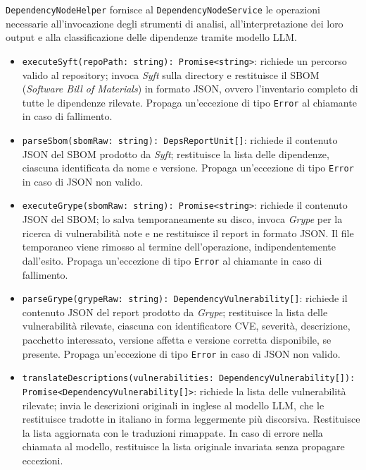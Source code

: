 \documentclass[a4paper, 11pt]{article}
\newcounter{subsubsubsection}[subsubsection]
\begin{document}
\texttt{DependencyNodeHelper} fornisce al \texttt{DependencyNodeService} le operazioni
necessarie all'invocazione degli strumenti di analisi, all'interpretazione dei loro
output e alla classificazione delle dipendenze tramite modello LLM.
\begin{itemize}
  \item \texttt{executeSyft(repoPath: string): Promise<string>}:
  richiede un percorso valido al repository; invoca \textit{Syft} sulla directory e
  restituisce il SBOM (\textit{Software Bill of Materials}) in formato JSON, ovvero
  l'inventario completo di tutte le dipendenze rilevate. Propaga un'eccezione di tipo
  \texttt{Error} al chiamante in caso di fallimento.
 
  \item \texttt{parseSbom(sbomRaw: string): DepsReportUnit[]}:
  richiede il contenuto JSON del SBOM prodotto da \textit{Syft}; restituisce la lista
  delle dipendenze, ciascuna identificata da nome e versione. Propaga un'eccezione di
  tipo \texttt{Error} in caso di JSON non valido.
 
  \item \texttt{executeGrype(sbomRaw: string): Promise<string>}:
  richiede il contenuto JSON del SBOM; lo salva temporaneamente su disco, invoca
  \textit{Grype} per la ricerca di vulnerabilità note e ne restituisce il report in
  formato JSON. Il file temporaneo viene rimosso al termine dell'operazione,
  indipendentemente dall'esito. Propaga un'eccezione di tipo \texttt{Error} al
  chiamante in caso di fallimento.
 
  \item \texttt{parseGrype(grypeRaw: string): DependencyVulnerability[]}:
  richiede il contenuto JSON del report prodotto da \textit{Grype}; restituisce la
  lista delle vulnerabilità rilevate, ciascuna con identificatore CVE, severità,
  descrizione, pacchetto interessato, versione affetta e versione corretta disponibile,
  se presente. Propaga un'eccezione di tipo \texttt{Error} in caso di JSON non valido.
 
  \item \texttt{translateDescriptions(vulnerabilities: DependencyVulnerability[]):}
  \newline \texttt{Promise<DependencyVulnerability[]>}: \newline
  richiede la lista delle vulnerabilità rilevate; invia le descrizioni originali in
  inglese al modello LLM, che le restituisce tradotte in italiano in forma leggermente
  più discorsiva. Restituisce la lista aggiornata con le traduzioni rimappate. In caso
  di errore nella chiamata al modello, restituisce la lista originale invariata senza
  propagare eccezioni.
 

\end{itemize}
\end{document}
